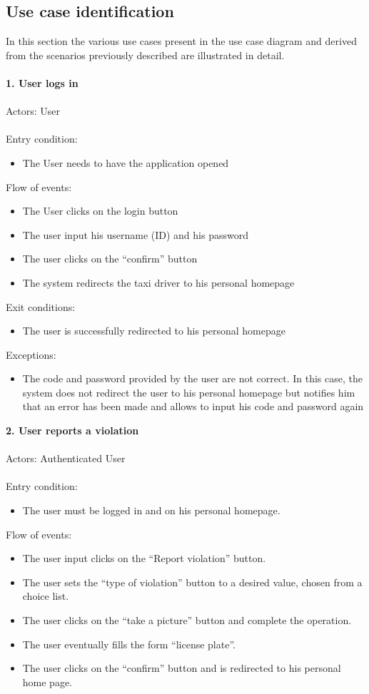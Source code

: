 \documentclass[a4paper]{report}
\begin{document}
\subsection{Use case identification}
In this section the various use cases present in the use case diagram and derived from the scenarios previously described are illustrated in detail.\\ \\
\textbf{1. User logs in}\label{uc:1}
\\
\\
Actors: User\\ \\
Entry condition: 
\begin{itemize}
\item The User needs to have the application opened
\end{itemize}
Flow of events:
\begin{itemize}
\item The User clicks on the login button
\item The user input his username (ID) and his password
\item The user clicks on the “confirm” button
\item The system redirects the taxi driver to his personal homepage
\end{itemize}
Exit conditions: 
\begin{itemize}
\item The user is successfully redirected to his personal homepage
\end{itemize}
Exceptions: 
\begin{itemize}
\item The code and password provided by the user are not correct. In this case, the system does not redirect the user to his personal homepage but notifies him that an error has been made and allows to input his code and password again
\end{itemize}
\textbf{2. User reports a violation}\label{uc:2} \\ \\
Actors: Authenticated User\\ \\
Entry condition:
\begin{itemize}
 \item The user must be logged in and on his personal homepage.
 \end{itemize}
Flow of events:
 \begin{itemize}
\item The user input clicks on the “Report violation” button.
\item The user sets the “type of violation” button to a desired value, chosen from a choice list.
\item The user clicks on the “take a picture” button and complete the operation.
\item The user eventually fills the form “license plate”.
\item The user clicks on the “confirm” button and is redirected to his personal home page.
\end{itemize}
\end{document}
